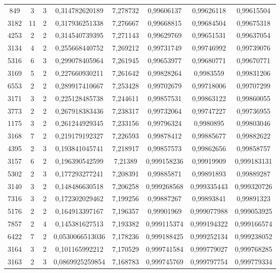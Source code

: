 \begin{longtable}{|c|c|c|c|c|c|c|c|}
849 & 3 & 3 & 0,314782620189 & 7,278732 & 0,99606137 & 0,99626118 & 0,99615504 \\
3182 & 11 & 2 & 0,317936251338 & 7,276667 & 0,99668815 & 0,99684504 & 0,99675318 \\
4253 & 2 & 2 & 0,314540739395 & 7,271143 & 0,99629769 & 0,99651531 & 0,99637054 \\
3134 & 4 & 2 & 0,255668440752 & 7,269212 & 0,99731749 & 0,99746992 & 0,99739076 \\
5316 & 6 & 3 & 0,299078405964 & 7,261945 & 0,99653977 & 0,99680771 & 0,99670771 \\
3169 & 5 & 2 & 0,227660930211 & 7,261642 & 0,99828264 & 0,9983559 & 0,99831206 \\
6553 & 2 & 2 & 0,289917410667 & 7,253428 & 0,99702679 & 0,99718006 & 0,99707299 \\
3171 & 3 & 2 & 0,225128485738 & 7,244611 & 0,99857531 & 0,99863122 & 0,99860055 \\
3773 & 2 & 2 & 0,267918383436 & 7,238317 & 0,99732064 & 0,99747227 & 0,99736955 \\
1175 & 3 & 2 & 0,261244929345 & 7,233156 & 0,99796324 & 0,9980895 & 0,99803046 \\
3168 & 7 & 2 & 0,219179192327 & 7,226593 & 0,99878412 & 0,99885677 & 0,99882622 \\
4395 & 2 & 3 & 0,193841045741 & 7,218917 & 0,99857573 & 0,99862656 & 0,99858757 \\
3157 & 6 & 2 & 0,196390542599 & 7,21389 & 0,999158236 & 0,99919909 & 0,999183131 \\
5302 & 2 & 3 & 0,177293277241 & 7,208391 & 0,99885871 & 0,99891893 & 0,99889287 \\
3140 & 3 & 2 & 0,148486630518 & 7,206258 & 0,999268568 & 0,999335443 & 0,999320726 \\
7316 & 3 & 2 & 0,172302029462 & 7,199256 & 0,99887267 & 0,99893841 & 0,99891323 \\
5176 & 2 & 2 & 0,164913397167 & 7,196357 & 0,99901969 & 0,999077988 & 0,999053925 \\
7857 & 2 & 4 & 0,145381627513 & 7,193382 & 0,999115374 & 0,999194322 & 0,999166574 \\
6422 & 7 & 2 & 0,0530066513036 & 7,178236 & 0,999188425 & 0,999252134 & 0,999238052 \\
3164 & 3 & 2 & 0,101165992212 & 7,170529 & 0,999741584 & 0,999779027 & 0,999768285 \\
3163 & 2 & 3 & 0,0869925259854 & 7,168783 & 0,999745769 & 0,999797754 & 0,999779334 \\

\end{longtable}
